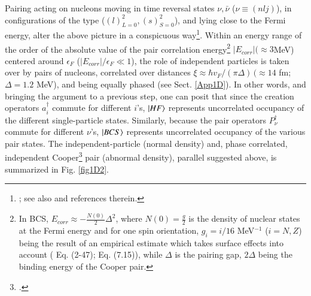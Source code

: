 Pairing acting on nucleons moving in time reversal states $\nu,\bar\nu$ ($\nu\equiv(nlj)$), in configurations of the type ($(l)^2_{L=0},(s)^2_{S=0}$), and lying close to the Fermi energy, alter the above picture in a conspicuous way\footnote{\cite{Bohr:58}; see also \cite{Broglia:13} and references therein.}. Within an energy range of the order of the absolute value of the pair  
 correlation energy\footnote{In BCS, $E_{corr}\approx-\frac{N(0)}{2}\Delta^2$, where $N(0)=\frac{g}{2}$ is the density of nuclear states at the Fermi energy and for one spin orientation, $g_i=i/16$ MeV$^{-1}$ ($i=N,Z$) being the result of an empirical estimate which takes surface effects into account (\cite{Bohr:75} Eq. (2-47); \cite{Bortignon:98} Eq. (7.15)), while $\Delta$ is the pairing gap, $2\Delta$ being the binding energy of the Cooper pair.} $|E_{corr}|(\approx 3 $MeV) centered around $\epsilon_F$ ($|E_{corr}|/\epsilon_F\ll1$), the role of independent particles is taken over by  pairs of nucleons, correlated over distances $\xi\approx\hbar v_F/(\pi\Delta)\,(\approx 14$ fm; $\Delta=1.2$ MeV), and being equally phased (see Sect. \ref{App1D}). In other words, and bringing the argument to a previous step, one can posit that since the creation operators $a^\dagger_i$ commute for different $i$'s, $|{HF} \rangle$ represents uncorrelated occupancy of the different single-particle states. Similarly, because the pair operators $P^\dagger_\nu$ commute for different $\nu$'s, $|{BCS} \rangle$ represents uncorrelated occupancy of the various pair states. The independent-particle (normal density) and, phase correlated, independent Cooper\footnote{\cite{Cooper:56}.} pair (abnormal density), parallel  suggested above, is summarized in Fig. \ref{fig1D2}.




